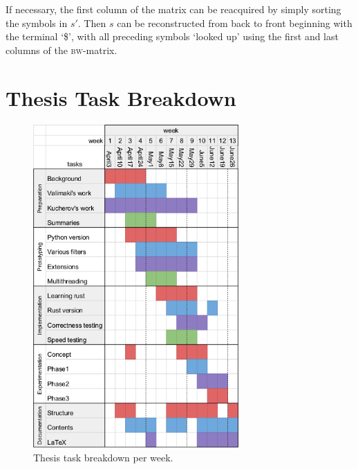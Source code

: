 If necessary, the first column of the matrix can be reacquired by simply sorting the symbols in $s'$. Then $s$ can be reconstructed from back to front beginning with the terminal `\$', with all preceding symbols `looked up' using the first and last columns of the \textsc{bw}-matrix.







\newpage
\section{Thesis Task Breakdown}

\begin{figure}[!htb]
\centering
\includegraphics[width=0.7\textwidth]{images/sheet.png}
\caption{Thesis task breakdown per week.}
\label{fig:planner}
\end{figure}
